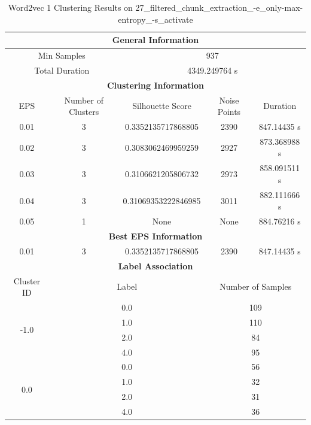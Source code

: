 \begin{longtable}{|c|c|c|c|c|}
\caption{Word2vec 1 Clustering Results on 27\_filtered\_chunk\_extraction\_-e\_only-max-entropy\_-s\_activate} \label{tab:27_filtered_chunk_extraction_-e_only-max-entropy_-s_activate_word2vec_1_clustering_results}\\
\hline
\multicolumn{5}{|c|}{\textbf{General Information}} \\
\hline
\multicolumn{2}{|c|}{Min Samples} & \multicolumn{3}{c|}{937} \\
\multicolumn{2}{|c|}{Total Duration} & \multicolumn{3}{c|}{4349.249764 s} \\
\hline
\multicolumn{5}{|c|}{\textbf{Clustering Information}} \\
\hline
EPS & Number of Clusters & Silhouette Score & Noise Points & Duration \\
0.01 & 3 & 0.3352135717868805 & 2390 & 847.14435 s\\
0.02 & 3 & 0.3083062469959259 & 2927 & 873.368988 s\\
0.03 & 3 & 0.3106621205806732 & 2973 & 858.091511 s\\
0.04 & 3 & 0.31069353222846985 & 3011 & 882.111666 s\\
0.05 & 1 & None & None & 884.76216 s\\
\hline
\multicolumn{5}{|c|}{\textbf{Best EPS Information}} \\
\hline
0.01 & 3 & 0.3352135717868805 & 2390 & 847.14435 s\\
\hline
\multicolumn{5}{|c|}{\textbf{Label Association}} \\
\hline
Cluster ID & \multicolumn{2}{c|}{Label} & \multicolumn{2}{c|}{Number of Samples} \\
\hline
\multirow{4}{*}{-1.0} & \multicolumn{2}{c|}{0.0} & \multicolumn{2}{c|}{109} \\
& \multicolumn{2}{c|}{1.0} & \multicolumn{2}{c|}{110} \\
& \multicolumn{2}{c|}{2.0} & \multicolumn{2}{c|}{84} \\
& \multicolumn{2}{c|}{4.0} & \multicolumn{2}{c|}{95} \\
\hline
\multirow{4}{*}{0.0} & \multicolumn{2}{c|}{0.0} & \multicolumn{2}{c|}{56} \\
& \multicolumn{2}{c|}{1.0} & \multicolumn{2}{c|}{32} \\
& \multicolumn{2}{c|}{2.0} & \multicolumn{2}{c|}{31} \\
& \multicolumn{2}{c|}{4.0} & \multicolumn{2}{c|}{36} \\
\hline

\end{longtable}
